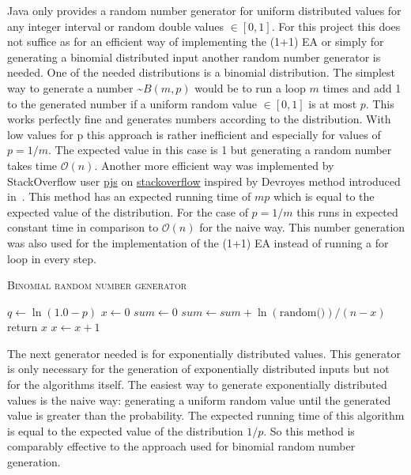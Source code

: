 Java only provides a random number generator for uniform distributed values for any integer interval or random double values $\in [0,1]$. 
For this project this does not suffice as for an efficient way of implementing the (1+1) EA or simply for generating a binomial distributed input another random number generator is needed. One of the needed distributions is a binomial distribution. The simplest way to generate a number \textasciitilde$B(m,p)$ would be to run a loop $m$ times and add 1 to the generated number if a uniform random value $\in [0,1]$ is at most $p$. This works perfectly fine and generates numbers according to the distribution. With low values for p this approach is rather inefficient and especially for values of $p=1/m$. The expected value in this case is 1 but generating a random number takes time $\mathcal{O}(n)$. Another more efficient way was implemented by StackOverflow user \href{https://stackoverflow.com/users/2166798/pjs}{pjs} on \href{https://stackoverflow.com/questions/23561551/a-efficient-binomial-random-number-generator-code-in-java}{stackoverflow} inspired by Devroyes method introduced in~\cite{devroye2006nonuniform}. This method has an expected running time of $mp$ which is equal to the expected value of the distribution. For the case of $p=1/m$ this runs in expected constant time in comparison to $\mathcal{O}(n)$ for the naive way. This number generation was also used for the implementation of the (1+1) EA instead of running a for loop in every step.

\begin{algorithm}[h]
      \caption{\textsc{Binomial random number generator}}\label{alg:binomialRNG}

      \DontPrintSemicolon %
      $q \leftarrow \ln(1.0 - p)$\;
      $x \leftarrow 0$\;
      $sum \leftarrow 0$\;
      {
            $sum \leftarrow sum +\ln(\text{random()}) / (n - x)$\; \tcp{random() generates a random value $\in \left[0, 1\right)$}
            {
                return $x$\;
            }
            $x \leftarrow x + 1$\;
      }
\end{algorithm}

The next generator needed is for exponentially distributed values. This generator is only necessary for the generation of exponentially distributed inputs but not for the algorithms itself. The easiest way to generate exponentially distributed values is the naive way: generating a uniform random value until the generated value is greater than the probability. The expected running time of this algorithm is equal to the expected value of the distribution $1/p$. So this method is comparably effective to the approach used for binomial random number generation. 

